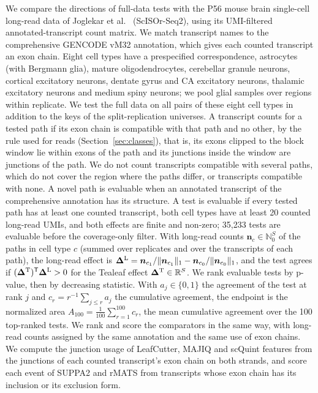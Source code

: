 \documentclass[11pt]{article}
\begin{document}
We compare the directions of full-data tests with the P56 mouse brain single-cell long-read data of Joglekar et al.\ \cite{joglekar2024} (ScISOr-Seq2), using its UMI-filtered annotated-transcript count matrix. We match transcript names to the comprehensive GENCODE vM32 annotation, which gives each counted transcript an exon chain. Eight cell types have a prespecified correspondence, astrocytes (with Bergmann glia), mature oligodendrocytes, cerebellar granule neurons, cortical excitatory neurons, dentate gyrus and CA excitatory neurons, thalamic excitatory neurons and medium spiny neurons; we pool glial samples over regions within replicate. We test the full data on all pairs of these eight cell types in addition to the keys of the split-replication universes. A transcript counts for a tested path if its exon chain is compatible with that path and no other, by the rule used for reads (Section~\ref{sec:classes}), that is, its exons clipped to the block window lie within exons of the path and its junctions inside the window are junctions of the path. We do not count transcripts compatible with several paths, which do not cover the region where the paths differ, or transcripts compatible with none. A novel path is evaluable when an annotated transcript of the comprehensive annotation has its structure. A test is evaluable if every tested path has at least one counted transcript, both cell types have at least 20 counted long-read UMIs, and both effects are finite and non-zero; 35{,}233 tests are evaluable before the coverage-only filter. With long-read counts $\bm n_c\in\mathbb N_0^S$ of the paths in cell type $c$ (summed over replicates and over the transcripts of each path), the long-read effect is $\bm\Delta^{\rm L}=\bm n_{c_1}/\|\bm n_{c_1}\|_1-\bm n_{c_0}/\|\bm n_{c_0}\|_1$, and the test agrees if $(\bm\Delta^{\rm T})^{\mathsf T}\bm\Delta^{\rm L}>0$ for the Tealeaf effect $\bm\Delta^{\rm T}\in\mathbb R^S$. We rank evaluable tests by p-value, then by decreasing statistic. With $a_j\in\{0,1\}$ the agreement of the test at rank $j$ and $c_r=r^{-1}\sum_{j\le r}a_j$ the cumulative agreement, the endpoint is the normalized area $A_{100}=\frac{1}{100}\sum_{r=1}^{100}c_r$, the mean cumulative agreement over the 100 top-ranked tests. We rank and score the comparators in the same way, with long-read counts assigned by the same annotation and the same use of exon chains. We compute the junction usage of LeafCutter, MAJIQ and scQuint features from the junctions of each counted transcript's exon chain on both strands, and score each event of SUPPA2 and rMATS from transcripts whose exon chain has its inclusion or its exclusion form.
\end{document}

